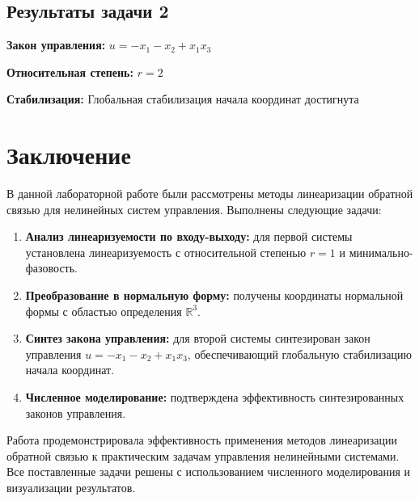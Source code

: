 \subsection{Результаты задачи 2}

\textbf{Закон управления:} $u = -x_1 - x_2 + x_1 x_3$

\textbf{Относительная степень:} $r = 2$

\textbf{Стабилизация:} Глобальная стабилизация начала координат достигнута

\section{Заключение}

В данной лабораторной работе были рассмотрены методы линеаризации обратной связью для нелинейных систем управления. Выполнены следующие задачи:

\begin{enumerate}
\item \textbf{Анализ линеаризуемости по входу-выходу:} для первой системы установлена линеаризуемость с относительной степенью $r = 1$ и минимально-фазовость.

\item \textbf{Преобразование в нормальную форму:} получены координаты нормальной формы с областью определения $\mathbb{R}^3$.

\item \textbf{Синтез закона управления:} для второй системы синтезирован закон управления $u = -x_1 - x_2 + x_1 x_3$, обеспечивающий глобальную стабилизацию начала координат.

\item \textbf{Численное моделирование:} подтверждена эффективность синтезированных законов управления.
\end{enumerate}

Работа продемонстрировала эффективность применения методов линеаризации обратной связью к практическим задачам управления нелинейными системами. Все поставленные задачи решены с использованием численного моделирования и визуализации результатов.
